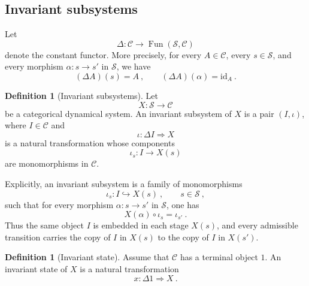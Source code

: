 \documentclass[a4paper,reqno,oneside]{amsart}
\theoremstyle{definition}
\newtheorem{definition}[theorem]{Definition}
\theoremstyle{remark}
\newcommand{\id}{\mathrm{id}}
\numberwithin{equation}{section}
\begin{document}
	
	\subsection{Invariant subsystems}
	
	
	
	
	Let
	\begin{equation}
		\Delta \colon \mathcal C \to \operatorname{Fun}(\mathcal S,\mathcal C)
	\end{equation}
	denote the constant functor. More precisely, for every $A\in\mathcal C$,
	every $s\in\mathcal S$, and every morphism $\alpha\colon s\to s'$ in
	$\mathcal S$, we have
	\begin{equation}
		(\Delta A)(s)=A \ ,
		\qquad
		(\Delta A)(\alpha)=\id_A \ .
	\end{equation}
	
	\begin{definition}[Invariant subsystems]\label{def: invariant subsystem}
		Let
		\begin{equation}
			X\colon \mathcal S\to\mathcal C
		\end{equation}
		be a categorical dynamical system. An invariant subsystem of $X$ is a pair
		$(I,\iota)$, where $I\in\mathcal C$ and
		\begin{equation}
			\iota\colon \Delta I\Longrightarrow X
		\end{equation}
		is a natural transformation whose components
		\begin{equation}
			\iota_s\colon I\longrightarrow X(s)
		\end{equation}
		are monomorphisms in $\mathcal C$.
	\end{definition}
	
	Explicitly, an invariant subsystem is a family of monomorphisms
	\begin{equation}
		\iota_s\colon I\hookrightarrow X(s) \ ,
		\qquad s\in\mathcal S \ ,
	\end{equation}
	such that for every morphism $\alpha\colon s\to s'$ in $\mathcal S$, one has
	\begin{equation}
		X(\alpha)\circ \iota_s=\iota_{s'} \ .
	\end{equation}
	Thus the same object $I$ is embedded in each stage $X(s)$, and every admissible transition carries the copy of $I$ in $X(s)$ to the copy of $I$ in $X(s')$.
	
	\begin{definition}[Invariant state]
		Assume that $\mathcal C$ has a terminal object $1$. An invariant state of
		$X$ is a natural transformation
		\begin{equation}
			x\colon \Delta 1\Longrightarrow X \ .
		\end{equation}
	\end{definition}
	
\end{document}
